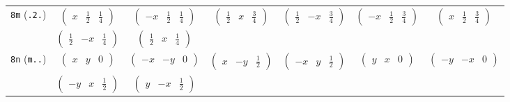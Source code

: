 \documentclass[fleqn,9pt,landscape]{jsarticle}
\begin{document}
\begin{center}
\begin{longtable}{ccccccc}
{\tt 8m} ({\tt .2.}) & $ \begin{pmatrix} x & \frac{1}{2} & \frac{1}{4} \end{pmatrix} $ & $ \begin{pmatrix} - x & \frac{1}{2} & \frac{1}{4} \end{pmatrix} $ & $ \begin{pmatrix} \frac{1}{2} & x & \frac{3}{4} \end{pmatrix} $ & $ \begin{pmatrix} \frac{1}{2} & - x & \frac{3}{4} \end{pmatrix} $ & $ \begin{pmatrix} - x & \frac{1}{2} & \frac{3}{4} \end{pmatrix} $ & $ \begin{pmatrix} x & \frac{1}{2} & \frac{3}{4} \end{pmatrix} $ \\
& $ \begin{pmatrix} \frac{1}{2} & - x & \frac{1}{4} \end{pmatrix} $ & $ \begin{pmatrix} \frac{1}{2} & x & \frac{1}{4} \end{pmatrix} $ & $  $ & $  $ & $  $ & $  $ \\ \hline
{\tt 8n} ({\tt m..}) & $ \begin{pmatrix} x & y & 0 \end{pmatrix} $ & $ \begin{pmatrix} - x & - y & 0 \end{pmatrix} $ & $ \begin{pmatrix} x & - y & \frac{1}{2} \end{pmatrix} $ & $ \begin{pmatrix} - x & y & \frac{1}{2} \end{pmatrix} $ & $ \begin{pmatrix} y & x & 0 \end{pmatrix} $ & $ \begin{pmatrix} - y & - x & 0 \end{pmatrix} $ \\
& $ \begin{pmatrix} - y & x & \frac{1}{2} \end{pmatrix} $ & $ \begin{pmatrix} y & - x & \frac{1}{2} \end{pmatrix} $ & $  $ & $  $ & $  $ & $  $ \\ \hline

\end{longtable}
\end{center}
\end{document}
